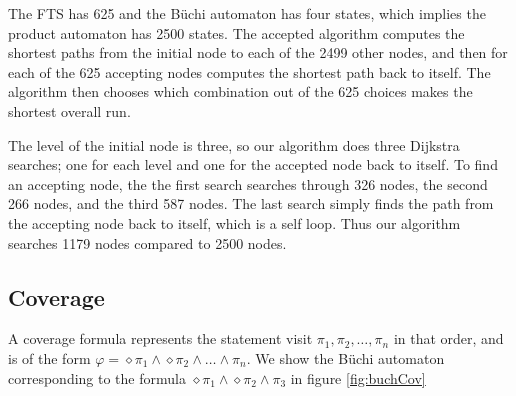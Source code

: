 The FTS has 625 and the B\"uchi automaton has four states, which implies the product automaton has 2500 states. The accepted algorithm computes the shortest paths from the initial node to each of the 2499 other nodes, and then for each of the 625 accepting nodes computes the shortest path back to itself. The algorithm then chooses which combination out of the 625 choices makes the shortest overall run. 

The level of the initial node is three, so our algorithm does three Dijkstra searches; one for each level and one for the accepted node back to itself. To find an accepting node, the the first search searches through 326 nodes, the second 266 nodes, and the third 587 nodes. The last search simply finds the path from the accepting node back to itself, which is a self loop. Thus our algorithm searches 1179 nodes compared to 2500 nodes.  



\subsection{Coverage}
A coverage formula represents the statement visit $\pi_1, \pi_2, \dots, \pi_n$ in that order, and is of the form $\varphi = \diamond \pi_1 \wedge \diamond \pi_2 \wedge \dots \wedge \pi_n$. We show the B\"uchi automaton corresponding to the formula $\diamond \pi_1 \wedge \diamond \pi_2 \wedge \pi_3$ in figure \ref{fig:buchCov}

